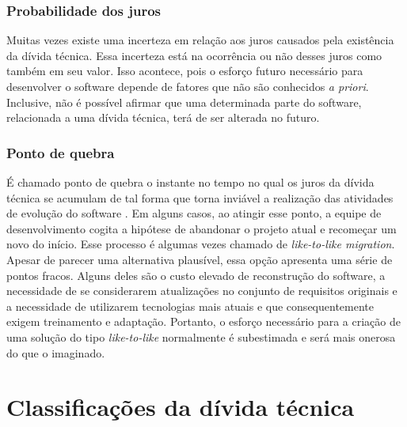 \subsubsection{Probabilidade dos juros}

Muitas vezes existe uma incerteza em relação aos juros causados pela existência da dívida técnica. Essa incerteza está na ocorrência ou não desses juros como também em seu valor.  
Isso acontece, pois o esforço futuro necessário para desenvolver o software depende de fatores que não são conhecidos \textit{a priori}. Inclusive, não é possível afirmar que uma determinada parte do software, relacionada a uma dívida técnica, terá de ser alterada no futuro. 

\subsubsection{Ponto de quebra}

É chamado ponto de quebra o instante no tempo no qual os juros da dívida técnica se acumulam de tal forma que torna inviável a realização das atividades de evolução do software \cite{chatzigeorgiou2015estimating}. Em alguns casos, ao atingir esse ponto, a equipe de desenvolvimento cogita a hipótese de abandonar o projeto atual e recomeçar um novo do início. Esse processo é algumas vezes chamado de \textit{like-to-like migration}.  Apesar de parecer uma alternativa plausível, essa opção apresenta uma série de pontos fracos. Alguns deles são o custo elevado de reconstrução do software, a necessidade de se considerarem atualizações no conjunto de requisitos originais e a necessidade de utilizarem tecnologias mais atuais e que consequentemente exigem treinamento e adaptação\cite{sterling2010managing}. Portanto, o esforço necessário para a criação de uma solução do tipo \textit{like-to-like} normalmente é subestimada e será mais onerosa do que o imaginado. 
 

\section{Classificações da dívida técnica}
\label{classificacoes_divida_tecnica}

